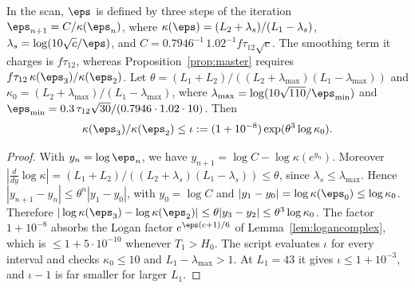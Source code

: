 \begin{lemma}\label{lem:iota}
In the scan, $\eps$ is defined by three steps of the iteration $\eps_{n+1} = C/\kappa(\eps_n)$, where
$\kappa(\eps) = (L_2 + \lambda_s)/(L_1 - \lambda_s)$, $\lambda_s = \log(10\sqrt c/\eps)$, and $C = 0.7946^{-1}\,1.02^{-1}f\tau_{12}\sqrt c$.
The smoothing term it charges is $f\tau_{12}$, whereas Proposition~\ref{prop:master} requires $f\tau_{12}\,\kappa(\eps_3)/\kappa(\eps_2)$.
Let $\theta = (L_1+L_2)/((L_2+\lambda_{\max})(L_1-\lambda_{\max}))$ and $\kappa_0 = (L_2+\lambda_{\max})/(L_1-\lambda_{\max})$, where $\lambda_{\max} = \log(10\sqrt{110}/\eps_{\min})$ and $\eps_{\min} = 0.3\,\tau_{12}\sqrt{30}/(0.7946\cdot1.02\cdot 10)$.
Then
\[
\kappa(\eps_3)/\kappa(\eps_2) \le \iota := (1 + 10^{-8})\exp(\theta^3\log\kappa_0) .
\]
\end{lemma}

\begin{proof}
With $y_n = \log\eps_n$, we have $y_{n+1} = \log C - \log\kappa(e^{y_n})$.
Moreover $|\frac{d}{dy}\log\kappa| = (L_1+L_2)/((L_2+\lambda_s)(L_1-\lambda_s)) \le \theta$, since $\lambda_s\le\lambda_{\max}$.
Hence $|y_{n+1} - y_n| \le \theta^n|y_1 - y_0|$, with $y_0 = \log C$ and $|y_1 - y_0| = \log\kappa(\eps_0) \le \log\kappa_0$.
Therefore $|\log\kappa(\eps_3) - \log\kappa(\eps_2)| \le \theta|y_3 - y_2| \le \theta^3\log\kappa_0$.
The factor $1+10^{-8}$ absorbs the Logan factor $e^{\eps(c+1)/6}$ of Lemma~\ref{lem:logancomplex}, which is $\le 1 + 5\cdot10^{-10}$ whenever $T_1 > H_0$.
The script  evaluates $\iota$ for every interval and checks $\kappa_0 \le 10$ and $L_1 - \lambda_{\max} > 1$.
At $L_1 = 43$ it gives $\iota \le 1 + 10^{-3}$, and $\iota - 1$ is far smaller for larger $L_1$.
\end{proof}
